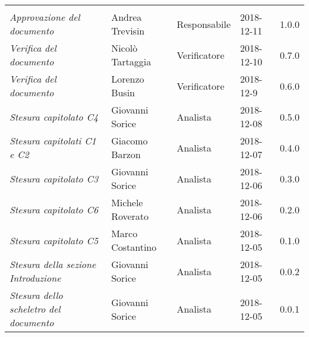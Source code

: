 \newpage 
\section*{}
\begin{table}[H]
	\centering
	\begin{tabular}{p{4cm}|C{3cm}|C{3cm}|R{2.5cm}|R{2cm}}
		
		 & & & & \\
		
		
		\emph{Approvazione del documento} & Andrea Trevisin & Responsabile & 2018-12-11 & 1.0.0 \\
		\hline
		
		\emph{Verifica del documento} & Nicolò Tartaggia & Verificatore & 2018-12-10 & 0.7.0 \\
		\hline
		
		\emph{Verifica del documento} & Lorenzo Busin & Verificatore & 2018-12-9 & 0.6.0 \\
		\hline
		
		\emph{Stesura capitolato C4 } & Giovanni Sorice & Analista & 2018-12-08 & 0.5.0 \\
		\hline
		
		\emph{Stesura capitolati C1 e C2} & Giacomo Barzon & Analista & 2018-12-07 & 0.4.0 \\
		\hline
		
		\emph{Stesura capitolato C3 } & Giovanni Sorice & Analista & 2018-12-06 & 0.3.0 \\
		\hline
		
		\emph{Stesura capitolato C6 } & Michele Roverato & Analista & 2018-12-06 & 0.2.0 \\
		\hline
		
		\emph{Stesura capitolato C5 } & Marco Costantino & Analista & 2018-12-05 & 0.1.0 \\
		\hline
		
		\emph{Stesura della sezione Introduzione } & Giovanni Sorice & Analista & 2018-12-05 & 0.0.2 \\
		\hline
		
		\emph{Stesura dello scheletro del documento} & Giovanni Sorice & Analista & 2018-12-05 & 0.0.1 \\
		
	\end{tabular}
	
\end{table}


\clearpage